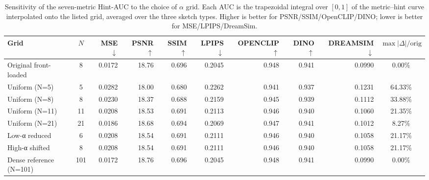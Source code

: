 \begin{table}[t]
  \centering
  \caption{Sensitivity of the seven-metric Hint-AUC to the choice of $\alpha$ grid. Each AUC is the trapezoidal integral over $[0,1]$ of the metric--hint curve interpolated onto the listed grid, averaged over the three sketch types. Higher is better for PSNR/SSIM/OpenCLIP/DINO; lower is better for MSE/LPIPS/DreamSim.}
  \label{tab:S-R2-1-B-2-7m}
  \small
  \begin{tabular}{l c rrrrrrr c}
    \toprule
    Grid & $N$ & MSE $\downarrow$ & PSNR $\uparrow$ & SSIM $\uparrow$ & LPIPS $\downarrow$ & OPENCLIP $\uparrow$ & DINO $\uparrow$ & DREAMSIM $\downarrow$ & $\max\!\big|\Delta\big|/\mathrm{orig}$ \\
    \midrule
    Original front-loaded      &   8 & 0.0172 & 18.76 & 0.696 & 0.2045 & 0.948 & 0.941 & 0.0990 &  0.00\% \\
    Uniform (N=5)              &   5 & 0.0282 & 18.00 & 0.680 & 0.2262 & 0.941 & 0.937 & 0.1231 & 64.33\% \\
    Uniform (N=8)              &   8 & 0.0230 & 18.37 & 0.688 & 0.2159 & 0.945 & 0.939 & 0.1112 & 33.88\% \\
    Uniform (N=11)             &  11 & 0.0208 & 18.53 & 0.691 & 0.2113 & 0.946 & 0.940 & 0.1060 & 21.35\% \\
    Uniform (N=21)             &  21 & 0.0186 & 18.68 & 0.694 & 0.2069 & 0.947 & 0.941 & 0.1012 &  8.27\% \\
    Low-α reduced              &   6 & 0.0208 & 18.54 & 0.691 & 0.2111 & 0.946 & 0.940 & 0.1058 & 21.17\% \\
    High-α shifted             &   8 & 0.0208 & 18.54 & 0.691 & 0.2111 & 0.946 & 0.940 & 0.1058 & 21.17\% \\
    Dense reference (N=101)    & 101 & 0.0172 & 18.76 & 0.696 & 0.2045 & 0.948 & 0.941 & 0.0990 &  0.00\% \\
    \bottomrule
  \end{tabular}
\end{table}
